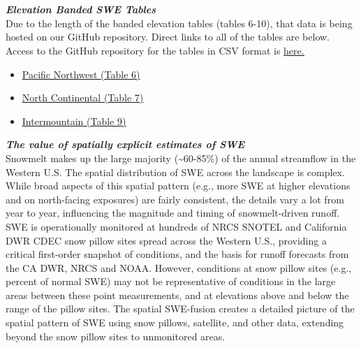 \documentclass{article}
\begin{document}
\section*{}\label{sec:elev_band_swe}
\fontsize{12}{16}
\noindent\textbf{\textit{Elevation Banded SWE Tables}}\\
\fontsize{10}{14}
\noindent Due to the length of the banded elevation tables (tables 6-10), that data is being hosted on our GitHub repository. Direct links to all of the tables are below. Access to the GitHub repository for the tables in CSV format is \href{https://github.com/CU-Mountain-Hydrology/WestWide}{\underline{here.}}
\begin{itemize}
    \item \href{https://github.com/CU-Mountain-Hydrology/WestWide/blob/main/WY_2026/PNW_{{ date }}_table06.csv}{\underline{Pacific Northwest (Table 6)}}
    \item \href{https://github.com/CU-Mountain-Hydrology/WestWide/blob/main/WY_2026/NOCN_{{ date }}_table07.csv}{\underline{North Continental (Table 7)}}
    \item \href{https://github.com/CU-Mountain-Hydrology/WestWide/blob/main/WY_2026/INMT_{{ date }}_table09.csv}{\underline{Intermountain (Table 9)}}
\end{itemize}

\fontsize{12}{16}
\noindent\textbf{\textit{The value of spatially explicit estimates of SWE}}\\
\fontsize{10}{14}
\noindent Snowmelt makes up the large majority (\textasciitilde60-85\%) of the annual streamflow in the Western U.S. The spatial distribution of SWE across the landscape is complex. While broad aspects of this spatial pattern (e.g., more SWE at higher elevations and on north-facing exposures) are fairly consistent, the details vary a lot from year to year, influencing the magnitude and timing of snowmelt-driven runoff.\\

\noindent SWE is operationally monitored at hundreds of NRCS SNOTEL and California DWR CDEC snow pillow sites spread across the Western U.S., providing a critical first-order snapshot of conditions, and the basis for runoff forecasts from the CA DWR, NRCS and NOAA. However, conditions at snow pillow sites (e.g., percent of normal SWE) may not be representative of conditions in the large areas between these point measurements, and at elevations above and below the range of the pillow sites. The spatial SWE-fusion creates a detailed picture of the spatial pattern of SWE using snow pillows, satellite, and other data, extending beyond the snow pillow sites to unmonitored areas.\\
\end{document}
